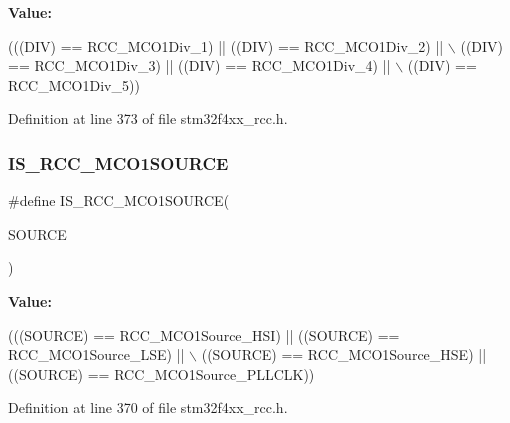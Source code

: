 {\bfseries Value\+:}
\begin{DoxyCode}
(((DIV) == RCC\_MCO1Div\_1) || ((DIV) == RCC\_MCO1Div\_2) || \(\backslash\)
                             ((DIV) == RCC\_MCO1Div\_3) || ((DIV) == RCC\_MCO1Div\_4) || \(\backslash\)
                             ((DIV) == RCC\_MCO1Div\_5))
\end{DoxyCode}


Definition at line 373 of file stm32f4xx\+\_\+rcc.\+h.

\mbox{\label{group___r_c_c___m_c_o1___clock___source___prescaler_ga073031d9c90c555f7874912b7e4905f6}} 
\subsubsection{\texorpdfstring{I\+S\+\_\+\+R\+C\+C\+\_\+\+M\+C\+O1\+S\+O\+U\+R\+CE}{IS\_RCC\_MCO1SOURCE}}
{\footnotesize\ttfamily \#define I\+S\+\_\+\+R\+C\+C\+\_\+\+M\+C\+O1\+S\+O\+U\+R\+CE(\begin{DoxyParamCaption}\item[{}]{S\+O\+U\+R\+CE }\end{DoxyParamCaption})}

{\bfseries Value\+:}
\begin{DoxyCode}
(((SOURCE) == RCC\_MCO1Source\_HSI) || ((SOURCE) == RCC\_MCO1Source\_LSE) || \(\backslash\)
                                   ((SOURCE) == RCC\_MCO1Source\_HSE) || ((SOURCE) == RCC\_MCO1Source\_PLLCLK))
\end{DoxyCode}


Definition at line 370 of file stm32f4xx\+\_\+rcc.\+h.

